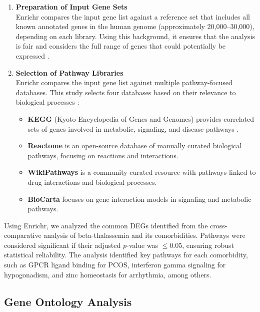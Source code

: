 \begin{enumerate}
    \item \textbf{Preparation of Input Gene Sets} \\
          Enrichr compares the input gene list against a reference set that includes all known annotated genes in the human genome (approximately 20,000--30,000), depending on each library. Using this background, it ensures that the analysis is fair and considers the full range of genes that could potentially be expressed \cite{b17}.
    \item \textbf{Selection of Pathway Libraries} \\
          Enrichr compares the input gene list against multiple pathway-focused databases. This study selects four databases based on their relevance to biological processes \cite{b19}:
          \begin{itemize}
              \item \textbf{KEGG} (Kyoto Encyclopedia of Genes and Genomes) provides correlated sets of genes involved in metabolic, signaling, and disease pathways \cite{b20}.
              \item \textbf{Reactome} is an open-source database of manually curated biological pathways, focusing on reactions and interactions.
              \item \textbf{WikiPathways} is a community-curated resource with pathways linked to drug interactions and biological processes.
              \item \textbf{BioCarta} focuses on gene interaction models in signaling and metabolic pathways.
          \end{itemize}
\end{enumerate}

Using Enrichr, we analyzed the common DEGs identified from the cross-comparative analysis of beta-thalassemia and its comorbidities. Pathways were considered significant if their adjusted $p$-value was $\leq 0.05$, ensuring robust statistical reliability. The analysis identified key pathways for each comorbidity, such as GPCR ligand binding for PCOS, interferon gamma signaling for hypogonadism, and zinc homeostasis for arrhythmia, among others.

\vspace*{-\parskip} %
\subsection{Gene Ontology Analysis}
\label{sec:sec3_4_5}

